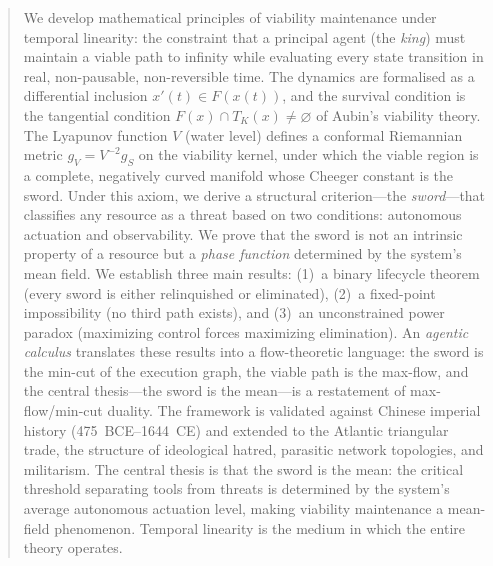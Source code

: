\documentclass[11pt, openany]{report}
\theoremstyle{plain}
\theoremstyle{definition}
\theoremstyle{remark}
\begin{document}
\begin{abstract}
We develop mathematical principles of viability maintenance under
temporal linearity: the constraint that a principal agent (the
\emph{king}) must maintain a viable path to infinity while evaluating
every state transition in real, non-pausable, non-reversible time.
The dynamics are formalised as a differential inclusion
$x'(t) \in F(x(t))$, and the survival condition is the tangential
condition $F(x) \cap T_K(x) \neq \varnothing$ of Aubin's viability
theory.  The Lyapunov function $V$ (water level) defines a conformal
Riemannian metric $g_V = V^{-2}g_S$ on the viability kernel, under
which the viable region is a complete, negatively curved manifold
whose Cheeger constant is the sword.
Under this axiom, we derive a structural criterion---the
\emph{sword}---that classifies any resource as a threat based on two
conditions: autonomous actuation and observability.  We prove that the
sword is not an intrinsic property of a resource but a \emph{phase
function} determined by the system's mean field.  We establish three
main results: (1)~a binary lifecycle theorem (every sword is either
relinquished or eliminated), (2)~a fixed-point impossibility (no third
path exists), and (3)~an unconstrained power paradox (maximizing control
forces maximizing elimination).  An \emph{agentic calculus} translates
these results into a flow-theoretic language: the sword is the min-cut
of the execution graph, the viable path is the max-flow, and the
central thesis---the sword is the mean---is a restatement of
max-flow/min-cut duality.  The framework is validated against Chinese
imperial history (475~BCE--1644~CE) and extended to the Atlantic
triangular trade, the structure of ideological hatred, parasitic network
topologies, and militarism.  The central thesis is that the sword is the
mean: the critical threshold separating tools from threats is determined
by the system's average autonomous actuation level, making viability
maintenance a mean-field phenomenon.  Temporal linearity is the medium
in which the entire theory operates.
\end{abstract}

\tableofcontents










\end{document}
